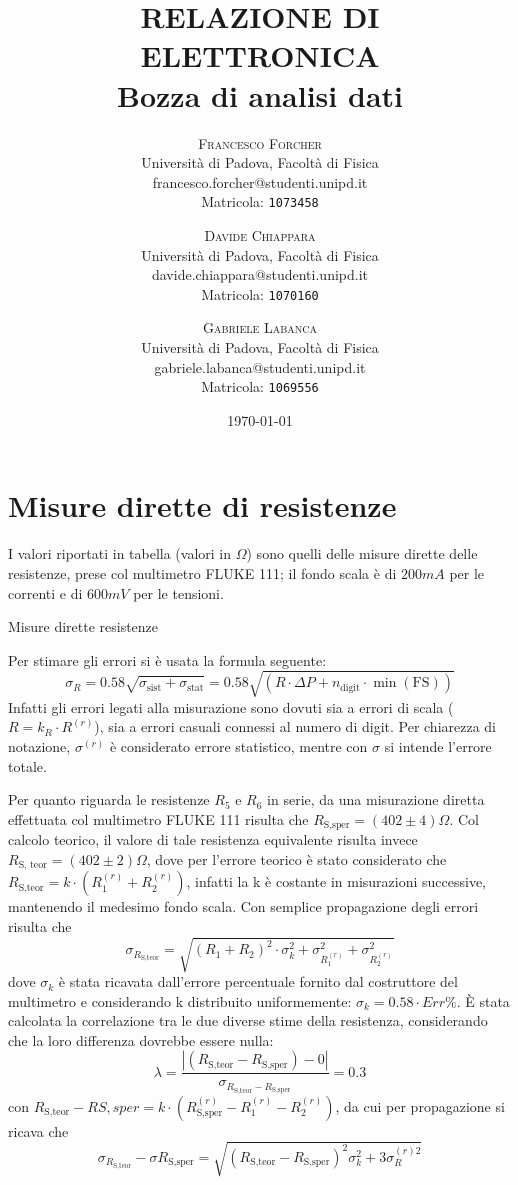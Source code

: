 \documentclass[11pt,a4paper]{article} %
\title{
\vspace{-2cm}
\fontsize{36pt}{10pt}\selectfont
RELAZIONE DI \\[8mm] ELETTRONICA \\[12mm]
Bozza di analisi dati
}
\author{
\large
\textsc{Francesco Forcher}\\[2mm]
\normalsize Università di Padova, Facoltà di Fisica\\
\normalsize francesco.forcher@studenti.unipd.it\\
\normalsize Matricola: \texttt{1073458}\\
\and
\large
\textsc{Davide Chiappara}\\[2mm]
\normalsize Università di Padova, Facoltà di Fisica\\
\normalsize davide.chiappara@studenti.unipd.it\\
\normalsize Matricola: \texttt{1070160}\\
\and
\large
\textsc{Gabriele Labanca}\\[2mm]
\normalsize Università di Padova, Facoltà di Fisica\\
\normalsize gabriele.labanca@studenti.unipd.it\\
\normalsize Matricola: \texttt{1069556}
}
\date{\today}
\begin{document}
{
\maketitle %



\section{Misure dirette di resistenze}
I valori riportati in tabella (valori in $\Omega$) sono quelli delle misure dirette delle resistenze, prese col multimetro FLUKE 111; il fondo scala \`e di $200mA$ per le correnti e di $600mV$ per le tensioni.

\begin{tabella}
	\centering
	
	\caption{Misure dirette resistenze}
	\label{tab:01_tab_1.tex}
\end{tabella}


Per stimare gli errori si \`e usata la formula seguente:
\[ \sigma_R =0.58 \sqrt{ \sigma_{\textrm{sist}} + \sigma_{\textrm{stat}}}= 0.58 \sqrt{(R\cdot\Delta P + n_{\textrm{digit}} \cdot \min(\textrm{FS}))}\]
Infatti gli errori legati alla misurazione sono dovuti sia a errori di scala ($ R= k _R \cdot R^{(r)} $), sia a errori casuali connessi al numero di digit. Per chiarezza di notazione, $\sigma^{(r)}$ \`e considerato errore statistico, mentre con $\sigma$ si intende l'errore totale.

Per quanto riguarda le resistenze $R_5$ e $R_6$ in serie, da una misurazione diretta effettuata col multimetro FLUKE 111 risulta che $R_{\textrm{S,sper}}= (402 \pm 4 )\Omega$. Col calcolo teorico, il valore di tale resistenza equivalente risulta invece $R_{\textrm{S, teor}}=(402 \pm 2 )\Omega$, dove per l'errore teorico \`e stato considerato che $R_{\textrm{S,teor}}=k\cdot(R_1^{(r)} + R_2^{(r)})$, infatti la k \`e costante in misurazioni successive, mantenendo il medesimo fondo scala. Con semplice propagazione degli errori risulta che 
\[\sigma_{R_{\textrm{S,teor}}}=\sqrt{(R_1+R_2)^2\cdot\sigma_k^2+\sigma_{R_1^{(r)}}^2+\sigma_{R_2^{(r)}}^2}\]
dove $\sigma_k$ \`e stata ricavata dall'errore percentuale fornito dal costruttore del multimetro e considerando k distribuito uniformemente:
\(\sigma_k=0.58 \cdot Err\%\). 
\`E stata calcolata la correlazione tra le due diverse stime della resistenza, considerando che la loro differenza dovrebbe essere nulla:
\[\lambda=\frac{\left|(R_{\textrm{S,teor}}-R_{\textrm{S,sper}})-0\right|}{\sigma_{R_{\textrm{S,teor}}-R_{\textrm{S,sper}}}}=0.3\]
con $R_{\textrm{S,teor}}-R{S,sper}=k\cdot(R_{\textrm{S,sper}}^{(r)}-R_1^{(r)}-R_2^{(r)})$, da cui per propagazione si ricava che 
\[ \sigma_{R_{\textrm{S,teor}}} - \sigma{R_{\textrm{S,sper}}} = 
        \sqrt{ (R_{\textrm{S,teor}} -R_{\textrm{S,sper}})^2 \sigma_k^2 + 3 \sigma_R^{(r) 2} }\]

}
\end{document}
